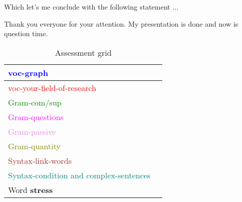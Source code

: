 Which let's me conclude with the following statement ...

Thank you everyone for your attention. My presentation is done and now is question time.

\setlength{\arrayrulewidth}{0.5mm}
\renewcommand{\arraystretch}{3}
\begin{table}[h]
    \centering
    \caption{Assessment grid}
    \label{tab:AssessmenttGrid}
    \begin{tabular}{|l|m{10cm}|}
        \hline
        \textcolor{blue}{voc-graph} & \\
        \hline
        \textcolor{red}{voc-your-field-of-research} & \\
        \hline
        \textcolor{green}{Gram-com/sup} & \\
        \hline
        \textcolor{magenta}{Gram-questions} & \\
        \hline
        \textcolor{violet}{Gram-passive} & \\
        \hline
        \textcolor{olive}{Gram-quantity} & \\
        \hline
        \textcolor{brown}{Syntax-link-words} & \\
        \hline
        \textcolor{teal}{Syntax-condition and complex-sentences} & \\
        \hline
        Word \textbf{stress}  & \\
        \hline
    \end{tabular}
\end{table}
